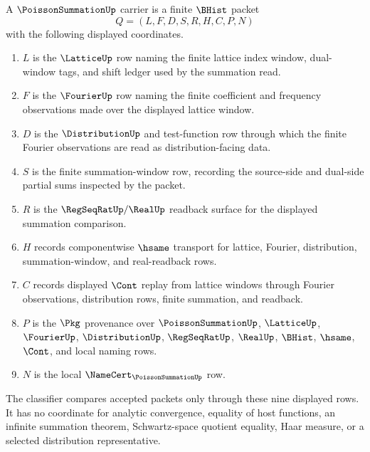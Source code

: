 \begin{definition}
\label{def:poisson-summation-finite-carrier}
A $\PoissonSummationUp$ carrier is a finite $\BHist$ packet
$$
Q=(L,F,D,S,R,H,C,P,N)
$$
with the following displayed coordinates.
\begin{enumerate}
  \item $L$ is the $\LatticeUp$ row naming the finite lattice index window, dual-window tags, and shift ledger used by the summation read.
  \item $F$ is the $\FourierUp$ row naming the finite coefficient and frequency observations made over the displayed lattice window.
  \item $D$ is the $\DistributionUp$ and test-function row through which the finite Fourier observations are read as distribution-facing data.
  \item $S$ is the finite summation-window row, recording the source-side and dual-side partial sums inspected by the packet.
  \item $R$ is the $\RegSeqRatUp/\RealUp$ readback surface for the displayed summation comparison.
  \item $H$ records componentwise $\hsame$ transport for lattice, Fourier, distribution, summation-window, and real-readback rows.
  \item $C$ records displayed $\Cont$ replay from lattice windows through Fourier observations, distribution rows, finite summation, and readback.
  \item $P$ is the $\Pkg$ provenance over $\PoissonSummationUp$, $\LatticeUp$, $\FourierUp$, $\DistributionUp$, $\RegSeqRatUp$, $\RealUp$, $\BHist$, $\hsame$, $\Cont$, and local naming rows.
  \item $N$ is the local $\NameCert_{\PoissonSummationUp}$ row.
\end{enumerate}
The classifier compares accepted packets only through these nine displayed rows. It has no coordinate for analytic convergence, equality of host functions, an infinite summation theorem, Schwartz-space quotient equality, Haar measure, or a selected distribution representative.
\end{definition}

